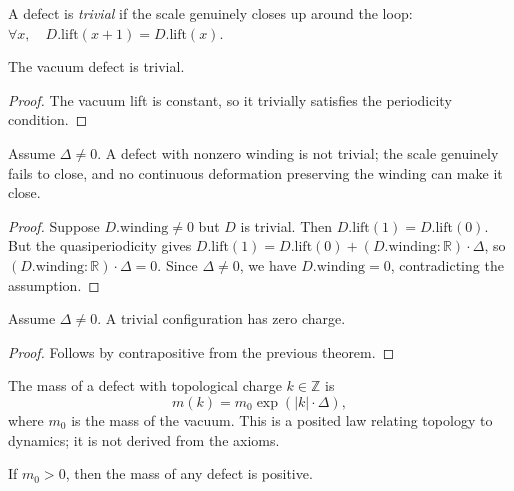 \begin{definition}
A defect is \emph{trivial} if the scale genuinely closes up around the loop: $\forall x, \quad D.\mathrm{lift}(x+1) = D.\mathrm{lift}(x)$.
\end{definition}

\begin{theorem}
The vacuum defect is trivial.
\end{theorem}

\begin{proof}
The vacuum lift is constant, so it trivially satisfies the periodicity condition.
\end{proof}

\begin{theorem}
Assume $\Delta \neq 0$. A defect with nonzero winding is not trivial; the scale genuinely fails to close, and no continuous deformation preserving the winding can make it close.
\end{theorem}

\begin{proof}
Suppose $D.\mathrm{winding} \neq 0$ but $D$ is trivial. Then $D.\mathrm{lift}(1) = D.\mathrm{lift}(0)$. But the quasiperiodicity gives $D.\mathrm{lift}(1) = D.\mathrm{lift}(0) + (D.\mathrm{winding} : \mathbb{R}) \cdot \Delta$, so $(D.\mathrm{winding} : \mathbb{R}) \cdot \Delta = 0$. Since $\Delta \neq 0$, we have $D.\mathrm{winding} = 0$, contradicting the assumption.
\end{proof}

\begin{theorem}
Assume $\Delta \neq 0$. A trivial configuration has zero charge.
\end{theorem}

\begin{proof}
Follows by contrapositive from the previous theorem.
\end{proof}

\begin{definition}
The mass of a defect with topological charge $k \in \mathbb{Z}$ is
\[ m(k) = m_0 \exp(|k| \cdot \Delta), \]
where $m_0$ is the mass of the vacuum. This is a posited law relating topology to dynamics; it is not derived from the axioms.
\end{definition}

\begin{theorem}
If $m_0 > 0$, then the mass of any defect is positive.
\end{theorem}

